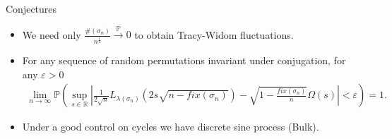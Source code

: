 \documentclass[english,xcolor=table]{beamer}
\begin{document}

\begin{frame}{Conjectures}
\begin{itemize}
\item We need only $\frac{\#(\sigma_n)}{n^\frac{1}{2}} \overset{\mathbb{P}}\to 0 $ to obtain Tracy-Widom fluctuations. 
\item For any sequence of random permutations invariant under conjugation, for any $\varepsilon>0$
\begin{align*}
\lim_{n\to \infty} \mathbb{P}\left(\sup_{s\in \mathbb{R}} \left|\frac{1}{2\sqrt{n}}L_{\lambda(\sigma_n)}\left({2s\sqrt{n-fix(\sigma_n)}}\right)-\sqrt{1-\frac{fix(\sigma_n)}{n}}\Omega\left(s\right)\right|<\varepsilon\right) =1.
\end{align*}
\item Under a good control on cycles we have discrete sine process (Bulk).
\end{itemize}

\end{frame}
\end{document}
